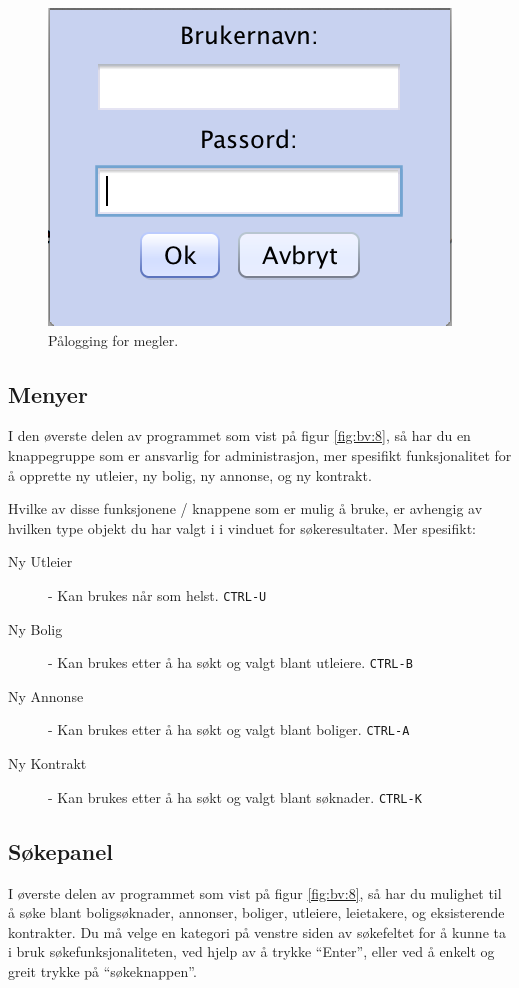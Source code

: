 \begin{figure}[h!]
\center
 \includegraphics[scale=0.7]{./img/brukerveiledning/7.png}
 \caption{Pålogging for megler.}
 \label{fig:bv:7}
\end{figure}





\subsection{Menyer}
I den øverste delen av programmet som vist på figur \ref{fig:bv:8}, så har du en knappegruppe som er ansvarlig
for administrasjon, mer spesifikt funksjonalitet for å opprette ny utleier, ny bolig, ny annonse, og
 ny kontrakt.

Hvilke av disse funksjonene / knappene som er mulig å bruke, er avhengig av hvilken type
objekt du har valgt i i vinduet for søkeresultater. Mer spesifikt:

\begin{description}
\item[Ny Utleier] -
Kan brukes når som helst. \texttt{CTRL-U}
\item[Ny Bolig] -
Kan brukes etter å ha søkt og valgt blant utleiere. \texttt{CTRL-B}
\item[Ny Annonse] -
Kan brukes etter å ha søkt og valgt blant boliger. \texttt{CTRL-A}
\item[Ny Kontrakt] -
Kan brukes etter å ha søkt og valgt blant søknader. \texttt{CTRL-K}
\end{description}




\newpage
\subsection{Søkepanel}
I øverste delen av programmet som vist på figur \ref{fig:bv:8}, så har du mulighet til å søke blant
boligsøknader, annonser, boliger, utleiere, leietakere, og eksisterende kontrakter.
Du må velge en kategori på venstre siden av søkefeltet for å kunne ta i bruk søkefunksjonaliteten,
ved hjelp av å trykke “Enter”, eller ved å enkelt og greit trykke på “søkeknappen”.


